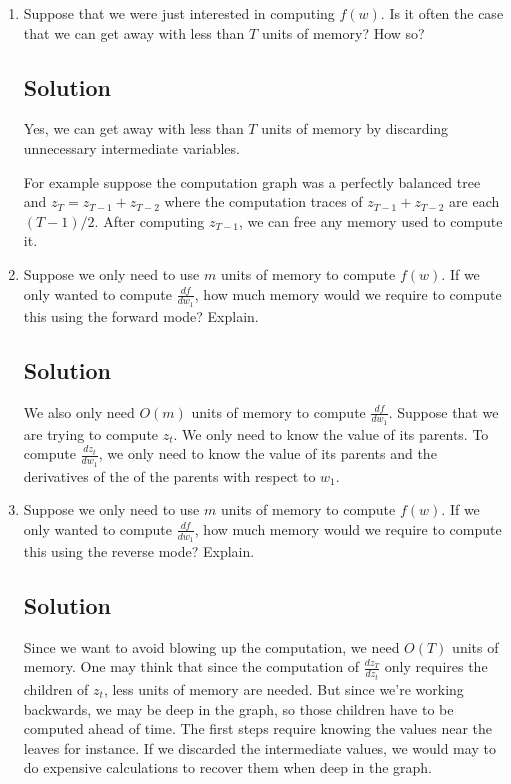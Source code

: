 \documentclass[letterpaper,11pt]{article}
\begin{document}
\begin{enumerate}
\item Suppose that we were just interested in computing $f(w)$. Is it often the
  case that we can get away with less than $T$ units of memory? How so?

  \subsection*{Solution}
  Yes, we can get away with less than $T$ units of memory by discarding
  unnecessary intermediate variables. 

  For example suppose the computation graph was a perfectly balanced tree and
  $z_T = z_{T - 1} + z_{T-2}$ where the computation traces of
  $z_{T - 1} + z_{T-2}$ are each $(T - 1)/2$. After computing $z_{T - 1}$, we
  can free any memory used to compute it.
  
\item Suppose we only need to use $m$ units of memory to compute $f(w)$. If we
  only wanted to compute $\frac{df}{dw_1}$, how much memory would we require to
  compute this using the forward mode? Explain.

  \subsection*{Solution}
  We also only need $O(m)$ units of memory to compute $\frac{df}{dw_1}$. Suppose
  that we are trying to compute $z_t$. We only need to know the value of its
  parents. To compute $\frac{dz_t}{dw_1}$, we only need to know the value of its
  parents and the derivatives of the of the parents with respect to $w_1$.
\item Suppose we only need to use $m$ units of memory to compute $f(w)$. If we
  only wanted to compute $\frac{df}{dw_1}$, how much memory would we require to
  compute this using the reverse mode? Explain.

  \subsection*{Solution}

  Since we want to avoid blowing up the computation, we need $O(T)$ units of
  memory. One may think that since the computation of $\frac{dz_T}{dz_t}$ only
  requires the children of $z_t$, less units of memory are needed. But since
  we're working backwards, we may be deep in the graph, so those children have
  to be computed ahead of time. The first steps require knowing the values near
  the leaves for instance. If we discarded the intermediate values, we would may
  to do expensive calculations to recover them when deep in the graph.


\end{enumerate}
\end{document}
